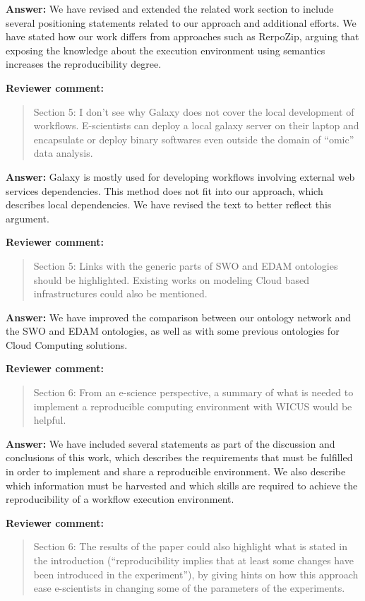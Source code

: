 \documentclass{letter}
\newenvironment{review}%
{\textbf{Reviewer comment:}\begin{quote}}%
{\end{quote}}%
\newcommand{\answer}[1]{%
      \textbf{Answer:} #1}
\begin{document}
\begin{letter}{}
\answer{We have revised and extended the related work section to include several positioning statements related to our approach and additional efforts. We have stated how our work differs from approaches such as RerpoZip, arguing that exposing the knowledge about the execution environment using semantics increases the reproducibility degree.}


\begin{review}
Section 5: I don't see why Galaxy does not cover the local development of workflows. E-scientists can deploy a local galaxy server on their laptop and encapsulate or deploy binary softwares even outside the domain of ``omic'' data analysis.
\end{review}

\answer{Galaxy is mostly used for developing workflows involving external web services dependencies. This method does not fit into our approach, which describes local dependencies. We have revised the text to better reflect this argument.} 



\begin{review}
Section 5: Links with the generic parts of SWO and EDAM ontologies should be highlighted. Existing works on modeling Cloud based infrastructures could also be mentioned.
\end{review}

\answer{We have improved the comparison between our ontology network and the SWO and EDAM ontologies, as well as with some previous ontologies for Cloud Computing solutions.}


\begin{review}
Section 6: From an e-science perspective, a summary of what is needed to implement a reproducible computing environment with WICUS would be helpful.
\end{review}

\answer{We have included several statements as part of the discussion and conclusions of this work, which describes the requirements that must be fulfilled in order to implement and share a reproducible environment. We also describe which information must be harvested and which skills are required to achieve the reproducibility of a workflow execution environment.}


\begin{review}
Section 6: The results of the paper could also highlight what is stated in the introduction (``reproducibility implies that at least some changes have been introduced in the experiment''), by giving hints on how this approach ease e-scientists in changing some of the parameters of the experiments.
\end{review}


\end{letter}
\end{document}
